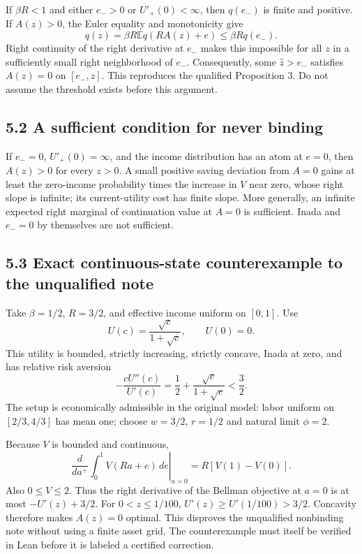 \documentclass[
  11pt,
]{article}
\begin{document}
If \(\beta R<1\) and either \(e_->0\) or \(U'_+(0)<\infty\), then
\(q(e_-)\) is finite and positive. If \(A(z)>0\), the Euler equality and
monotonicity give \[
q(z)=\beta R\mathbb E q(RA(z)+e)\leq\beta Rq(e_-).
\] Right continuity of the right derivative at \(e_-\) makes this
impossible for all \(z\) in a sufficiently small right neighborhood of
\(e_-\). Consequently, some \(\widehat z>e_-\) satisfies \(A(z)=0\) on
\([e_-,\widehat z]\). This reproduces the qualified Proposition 3. Do
not assume the threshold exists before this argument.

\subsection{5.2 A sufficient condition for never
binding}\label{a-sufficient-condition-for-never-binding}

If \(e_-=0\), \(U'_+(0)=\infty\), and the income distribution has an
atom at \(e=0\), then \(A(z)>0\) for every \(z>0\). A small positive
saving deviation from \(A=0\) gains at least the zero-income probability
times the increase in \(V\) near zero, whose right slope is infinite;
its current-utility cost has finite slope. More generally, an infinite
expected right marginal of continuation value at \(A=0\) is sufficient.
Inada and \(e_-=0\) by themselves are not sufficient.

\subsection{5.3 Exact continuous-state counterexample to the unqualified
note}\label{exact-continuous-state-counterexample-to-the-unqualified-note}

Take \(\beta=1/2\), \(R=3/2\), and effective income uniform on
\([0,1]\). Use \[
U(c)=\frac{\sqrt c}{1+\sqrt c},\qquad U(0)=0.
\] This utility is bounded, strictly increasing, strictly concave, Inada
at zero, and has relative risk aversion \[
-\frac{cU''(c)}{U'(c)}=\frac12+\frac{\sqrt c}{1+\sqrt c}<\frac32.
\] The setup is economically admissible in the original model: labor
uniform on \([2/3,4/3]\) has mean one; choose \(w=3/2\), \(r=1/2\) and
natural limit \(\phi=2\).

Because \(V\) is bounded and continuous, \[
\left.\frac{d}{da^+}\int_0^1V(Ra+e)\,de\right|_{a=0}
=R[V(1)-V(0)].
\] Also \(0\leq V\leq2\). Thus the right derivative of the Bellman
objective at \(a=0\) is at most \(-U'(z)+3/2\). For \(0<z\leq1/100\),
\(U'(z)\geq U'(1/100)>3/2\). Concavity therefore makes \(A(z)=0\)
optimal. This disproves the unqualified nonbinding note without using a
finite asset grid. The counterexample must itself be verified in Lean
before it is labeled a certified correction.
\end{document}
